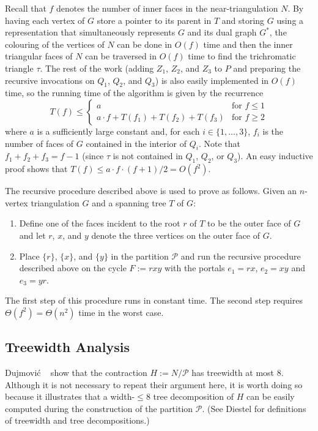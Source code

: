 \documentclass[kpfonts]{patmorin}
\let\le\leqslant
\let\ge\geqslant
\begin{document}
Recall that $f$ denotes the number of inner faces in the near-triangulation $N$.  By having each vertex of $G$ store a pointer to its parent in $T$ and storing $G$ using a representation that simultaneously represents $G$ and its dual graph $G^*$, the colouring of the vertices of $N$ can be done in $O(f)$ time and then the inner triangular faces of $N$ can be traversed in $O(f)$ time to find the trichromatic triangle $\tau$. The rest of the work (adding $Z_1$, $Z_2$, and $Z_3$ to $P$ and preparing the recursive invocations on $Q_1$, $Q_2$, and $Q_3$) is also easily implemented in $O(f)$ time, so the running time of the algorithm is given by the recurrence
\[  T(f) \le \begin{cases}
           a & \text{for $f\le 1$} \\
           a\cdot f + T(f_1)+T(f_2)+T(f_3) & \text{for $f\ge 2$}
         \end{cases}
 \]
where $a$ is a sufficiently large constant and, for each $i\in\{1,\ldots,3\}$, $f_i$ is the number of faces of $G$ contained in the interior of $Q_i$.
Note that $f_1+f_2+f_3=f-1$ (since $\tau$ is not contained in $Q_1$, $Q_2$, or $Q_3$).  An easy inductive proof shows that $T(f) \le a\cdot f\cdot (f+1)/2 = O(f^2)$.

The recursive procedure described above is used to prove  as follows.  Given an $n$-vertex triangulation $G$ and a spanning tree $T$ of $G$:
\begin{enumerate}
  \item Define one of the faces incident to the root $r$ of $T$ to be the outer face of $G$ and let $r$, $x$, and $y$ denote the three vertices on the outer face of $G$.
  \item Place $\{r\}$, $\{x\}$, and $\{y\}$ in the partition $\mathcal{P}$ and run the recursive procedure described above on the cycle $F:=rxy$ with the portals $e_1=rx$, $e_2=xy$ and $e_3=yr$.
\end{enumerate}
The first step of this procedure runs in constant time.  The second step requires $\Theta(f^2)=\Theta(n^2)$ time in the worst case.


\subsection{Treewidth Analysis}

Dujmović \etal\ \cite{dujmovic.joret.ea:planar} show that the contraction $H:=N/\mathcal{P}$ has treewidth at most 8.  Although it is not necessary to repeat their argument here, it is worth doing so because it illustrates that a width-$\le\!8$ tree decomposition of $H$ can be easily computed during the construction of the partition $\mathcal{P}$.  (See Diestel \cite[Chapter 12]{diestel:graph} for definitions of treewidth and tree decompositions.)
\end{document}
